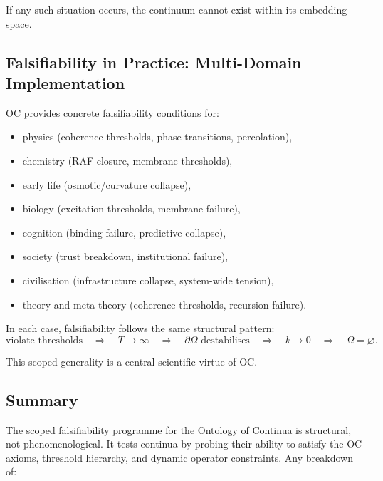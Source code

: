 If any such situation occurs, the continuum cannot exist within its
embedding space.



\subsection{Falsifiability in Practice: Multi-Domain Implementation}

OC provides concrete falsifiability conditions for:

\begin{itemize}
    \item physics (coherence thresholds, phase transitions, percolation),
    \item chemistry (RAF closure, membrane thresholds),
    \item early life (osmotic/curvature collapse),
    \item biology (excitation thresholds, membrane failure),
    \item cognition (binding failure, predictive collapse),
    \item society (trust breakdown, institutional failure),
    \item civilisation (infrastructure collapse, system-wide tension),
    \item theory and meta-theory (coherence thresholds, recursion failure).
\end{itemize}

In each case, falsifiability follows the same structural pattern:
\[
\text{violate thresholds} 
\quad \Rightarrow \quad
T \to \infty 
\quad \Rightarrow \quad
\partial\Omega \text{ destabilises} 
\quad \Rightarrow \quad
k \to 0 
\quad \Rightarrow \quad
\Omega = \varnothing.
\]

This scoped generality is a central scientific virtue of OC.



\subsection{Summary}

The scoped falsifiability programme for the Ontology of Continua is
structural, not phenomenological.
It tests continua by probing their ability to satisfy the OC axioms,
threshold hierarchy, and dynamic operator constraints.
Any breakdown of:

